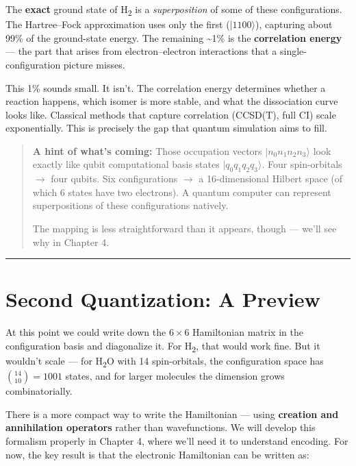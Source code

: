 \documentclass[
  11pt,
  oneside]{book}
\begin{document}
The \textbf{exact} ground state of H\textsubscript{2} is a \emph{superposition} of some
of these configurations. The Hartree--Fock approximation uses only the
first (\(\lvert 1100\rangle\)), capturing about 99\% of the ground-state
energy. The remaining \textasciitilde1\% is the \textbf{correlation
energy} --- the part that arises from electron--electron interactions
that a single-configuration picture misses.

This 1\% sounds small. It isn't. The correlation energy determines
whether a reaction happens, which isomer is more stable, and what the
dissociation curve looks like. Classical methods that capture
correlation (CCSD(T), full CI) scale exponentially. This is precisely
the gap that quantum simulation aims to fill.

\begin{quote}
\textbf{A hint of what's coming:} Those occupation vectors
\(\lvert n_0 n_1 n_2 n_3\rangle\) look exactly like qubit computational
basis states \(\lvert q_0 q_1 q_2 q_3\rangle\). Four spin-orbitals $\rightarrow$
four qubits. Six configurations $\rightarrow$ a 16-dimensional Hilbert space (of
which 6 states have two electrons). A quantum computer can represent
superpositions of these configurations natively.

The mapping is less straightforward than it appears, though --- we'll
see why in Chapter 4.
\end{quote}

\begin{center}\rule{0.5\linewidth}{0.5pt}\end{center}

\section{Second Quantization: A
Preview}\label{second-quantization-a-preview}

At this point we could write down the \(6 \times 6\) Hamiltonian matrix
in the configuration basis and diagonalize it. For H\textsubscript{2}, that would work
fine. But it wouldn't scale --- for H\textsubscript{2}O with 14 spin-orbitals, the
configuration space has \(\binom{14}{10} = 1001\) states, and for larger
molecules the dimension grows combinatorially.

There is a more compact way to write the Hamiltonian --- using
\textbf{creation and annihilation operators} rather than wavefunctions.
We will develop this formalism properly in Chapter 4, where we'll need
it to understand encoding. For now, the key result is that the
electronic Hamiltonian can be written as:
\end{document}
